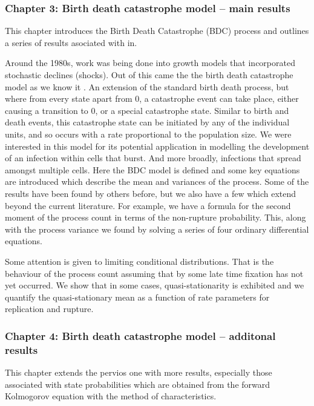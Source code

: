 \subsubsection{Chapter 3: Birth death catastrophe model -- main results}

This chapter introduces the Birth Death Catastrophe (BDC) process and outlines a series of results asociated with in. \par


\noindent
Around the 1980s, work was being done into growth models that incorporated stochastic declines (shocks). Out
of this came the the birth death catastrophe model as we know it \cite{cairns2004extinction}\cite{brockwell1985extinction} \cite{brockwell1982birth} \cite{dori2018family}.  An extension of the standard birth death
process, but where from every state apart from 0, a catastrophe event can take place, either causing a transition
to 0, or a special catastrophe state. Similar to birth and death events, this catastrophe state can be initiated by
any of the individual units, and so occurs with a rate proportional to the population size. We were interested
in this model for its potential application in modelling the development of an infection within cells that burst.
And more broadly, infections that spread amongst multiple cells.
Here the BDC model is defined and some key equations are introduced which describe the mean and variances
of the process. Some of the results have been found by others before, but we also have a few which extend beyond
the current literature. For example, we have a formula for the second moment of the process count in terms of the non-rupture probability. This, along with the process variance we found by solving a series of four ordinary differential equations.\par

Some attention is given to limiting conditional distributions. That is the behaviour of the process count assuming that by some late time fixation has not yet occurred.  We show that in some cases, quasi-stationarity is exhibited and we quantify the quasi-stationary mean as a function of rate parameters for replication and rupture.


\subsubsection{Chapter 4: Birth death catastrophe model -- additonal results}

This chapter extends the pervios one with more results,  especially those associated with state probabilities which are obtained from the forward Kolmogorov equation with the method of characteristics. 


